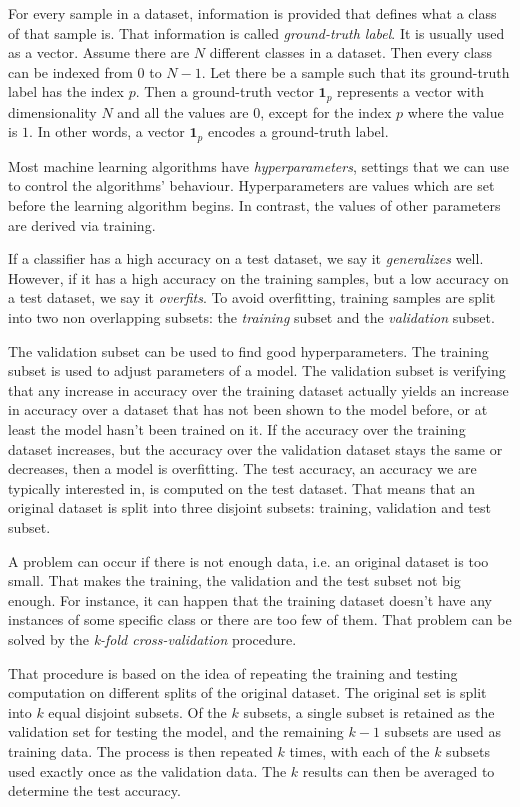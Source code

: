 For every sample in a dataset, information is provided that defines what a class of that sample is. That information is called \textit{ground-truth label}. It is usually used as a vector. Assume there are $N$ different classes in a dataset. Then every class can be indexed from $0$ to $N-1$. Let there be a sample such that its ground-truth label has the index $p$. Then a ground-truth vector $\pmb 1_p$ represents a vector with dimensionality $N$ and all the values are $0$, except for the index $p$ where the value is $1$. In other words, a vector $\pmb 1_p$ encodes a ground-truth label.

Most machine learning algorithms have \textit{hyperparameters}, settings that we can use to control the algorithms' behaviour. Hyperparameters are values which are set before the learning algorithm begins. In contrast, the values of other parameters are derived via training. 

If a classifier has a high accuracy on a test dataset, we say it \textit{generalizes} well. However, if it has a high accuracy on the training samples, but a low accuracy on a test dataset, we say it \textit{overfits}. To avoid overfitting, training samples are split into two non overlapping subsets: the \textit{training} subset and the \textit{validation} subset.

The validation subset can be used to find good hyperparameters. The training subset is used to adjust parameters of a model. The validation subset is verifying that any increase in accuracy over the training dataset actually yields an increase in accuracy over a dataset that has not been shown to the model before, or at least the model hasn't been trained on it. If the accuracy over the training dataset increases, but the accuracy over the validation dataset stays the same or decreases, then a model is overfitting. The test accuracy, an accuracy we are typically interested in, is computed on the test dataset. That means that an original dataset is split into three disjoint subsets: training, validation and test subset. 

A problem can occur if there is not enough data, i.e. an original dataset is too small. That makes the training, the validation and the test subset not big enough. For instance, it can happen that the training dataset doesn't have any instances of some specific class or there are too few of them. That problem can be solved by the \textit{k-fold cross-validation} procedure.

That procedure is based on the idea of repeating the training and testing computation on different splits of the original dataset. The original set is split into $k$ equal disjoint subsets. Of the $k$ subsets, a single subset is retained as the validation set for testing the model, and the remaining $k-1$ subsets are used as training data. The process is then repeated $k$ times, with each of the $k$ subsets used exactly once as the validation data. The $k$ results can then be averaged to determine the test accuracy. 

